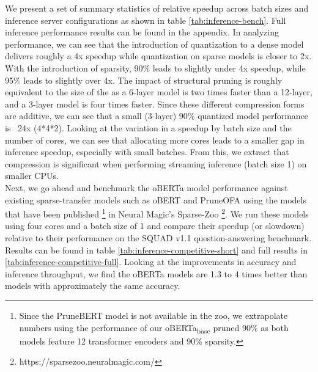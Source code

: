 We present a set of summary statistics of relative speedup across batch sizes and inference server configurations as shown in table \ref{tab:inference-bench}. Full inference performance results can be found in the appendix. In analyzing performance, we can see that the introduction of quantization to a dense model delivers roughly a 4x speedup while quantization on sparse models is closer to 2x. With the introduction of sparsity, 90\% leads to slightly under 4x speedup, while 95\% leads to slightly over 4x. The impact of structural pruning is roughly equivalent to the size of the as a 6-layer model is two times faster than a 12-layer, and a 3-layer model is four times faster. Since these different compression forms are additive, we can see that a small (3-layer) 90\% quantized model performance is ~24x (4*4*2). Looking at the variation in a speedup by batch size and the number of cores, we can see that allocating more cores leads to a smaller gap in inference speedup, especially with small batches. From this, we extract that compression is significant when performing streaming inference (batch size 1) on smaller CPUs.  \\
Next, we go ahead and benchmark the oBERTa model performance against existing sparse-transfer models such as oBERT and PruneOFA using the models that have been published \footnote{Since the PruneBERT model is not available in the zoo, we extrapolate numbers using the performance of our oBERTa\textsubscript{base} pruned 90\% as both models feature 12 transformer encoders and 90\% sparsity.} in Neural Magic's Sparse-Zoo \footnote{https://sparsezoo.neuralmagic.com/}. We run these models using four cores and a batch size of 1 and compare their speedup (or slowdown) relative to their performance on the SQUAD v1.1 question-answering benchmark. Results can be found in table \ref{tab:inference-competitive-short} and full results in \ref{tab:inference-competitive-full}. Looking at the improvements in accuracy and inference throughput, we find the oBERTa models are 1.3 to 4 times better than models with approximately the same accuracy.  \\
